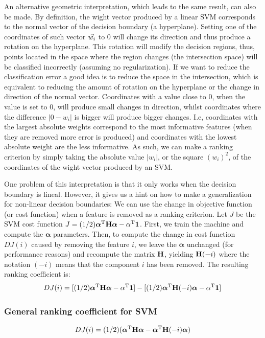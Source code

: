 An alternative geometric interpretation, which leads to the same result, can also be made. By definition, the wight vector produced by a linear SVM corresponds to the normal vector of the decision boundary (a hyperplane). Setting one of the coordinates of such vector $\vec{w_i}$ to $0$ will change its direction and thus produce a rotation on the hyperplane. This rotation will modify the decision regions, thus, points located in the space where the region changes (the intersection space) will be classified incorrectly (assuming no regularization). If we want to reduce the classification error a good idea is to reduce the space in the intersection, which is equivalent to reducing the amount of rotation on the hyperplane or the change in direction of the normal vector. Coordinates with a value close to $0$, when the value is set to $0$, will produce small changes in direction, whilst coordinates where the difference $|0 - w_i|$ is bigger will produce bigger changes. I.e, coordinates with the largest absolute weights correspond to the most informative features (when they are removed more error is produced) and coordinates with the lowest absolute weight are the less informative. As such, we can make a ranking criterion by simply taking the absolute value $|w_i|$, or the square $(w_i)^2$, of the coordinates of the wight vector produced by an SVM.

One problem of this interpretation is that it only works when the decision bound\-ary is lineal. However, it gives us a hint on how to make a generalization for non-linear decision boundaries: We can use the change in objective function (or cost function) when a feature is removed as a ranking criterion. Let $J$ be the SVM cost function $J = (1/2) \boldsymbol{\alpha}^{\text{T}} \mathbf{H} \boldsymbol{\alpha} - \alpha^{\text{T}} \mathbf{1}$. First, we train the machine and compute the $\boldsymbol{\alpha}$ parameters. Then, to compute the change in cost function $DJ(i)$ caused by removing the feature $i$, we leave the $\boldsymbol{\alpha}$ unchanged (for performance reasons) and recompute the matrix $\mathbf{H}$, yielding $\mathbf{H}(-i)$ where the notation $(-i)$ means that the component $i$ has been removed. The resulting ranking coefficient is:
\begin{align*}
    DJ(i) = [(1/2) \boldsymbol{\alpha}^{\text{T}} \mathbf{H} \boldsymbol{\alpha} - \alpha^{\text{T}} \mathbf{1}]
     - [(1/2) \boldsymbol{\alpha}^{\text{T}} \mathbf{H}(-i) \boldsymbol{\alpha} - \alpha^{\text{T}} \mathbf{1}]
\end{align*}

\subsubsection*{General ranking coefficient for SVM}
\label{eq:ch4.grankingcoeff}
\begin{align}
    DJ(i) = (1/2)(\boldsymbol{\alpha}^{\text{T}} \mathbf{H} \boldsymbol{\alpha} - \boldsymbol{\alpha}^{\text{T}} \mathbf{H}(-i) \boldsymbol{\alpha})
\end{align}

